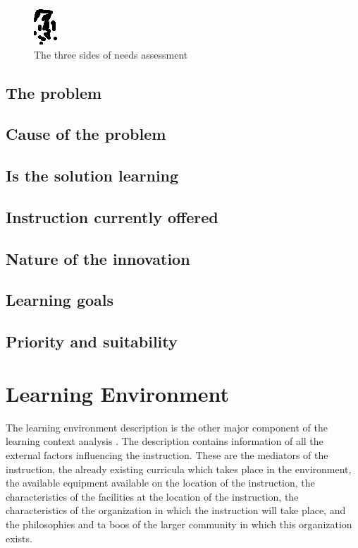 \documentclass[12pt]{report} %
\begin{document}
\begin{figure}[h]
\centering
\includegraphics{needsassessment}
\caption{\footnotesize The three sides of needs assessment \protect\cite{smithragan}\label{fig:needsassessment}}
\end{figure}

\subsection{The problem}

\subsection{Cause of the problem}

\subsection{Is the solution learning}

\subsection{Instruction currently offered}

\subsection{Nature of the innovation}

\subsection{Learning goals}

\subsection{Priority and suitability}


\section{Learning Environment}

The learning environment description is the other major component of the learning context analysis \cite{smithragan}. The description contains information of all the external factors influencing the instruction. These are the mediators of the instruction, the already existing curricula which takes place in the environment, the available equipment available on the location of the instruction, the characteristics of the facilities at the location of the instruction, the characteristics of the organization in which the instruction will take place, and the philosophies and ta boos of the larger community in which this organization exists.
\end{document}
